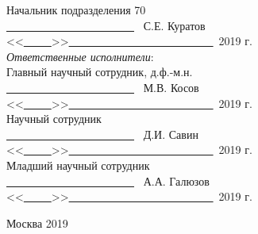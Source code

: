 \documentclass[a4paper,12pt]{article}
\begin{document}
\vspace{-.2cm}

\normalsize

\vspace{0.1 cm}
\begin{flushright}
Начальник подразделения 70 \\
\underline{~~~~~~~~~~~~~~~~~~~~~~~}~{ С.Е. Куратов}\\
<<\underline{~~~~~}>>\underline{~~~~~~~~~~~~~~~~~~~~~~~~~~}~2019 г. \\
\vspace{0.2 cm}
\emph{Ответственные исполнители}:\\
\vspace{0.1 cm}
Главный научный сотрудник, д.ф.-м.н.\\
\underline{~~~~~~~~~~~~~~~~~~~~~~~}~{ М.В. Косов}\\
<<\underline{~~~~~}>>\underline{~~~~~~~~~~~~~~~~~~~~~~~~~~}~2019 г.\\
\vspace{0.1 cm}
Научный сотрудник\\
\underline{~~~~~~~~~~~~~~~~~~~~~~~}~{ Д.И. Савин}\\
<<\underline{~~~~~}>>\underline{~~~~~~~~~~~~~~~~~~~~~~~~~~}~2019 г.\\
\vspace{0.1 cm}
Младший научный сотрудник\\
\underline{~~~~~~~~~~~~~~~~~~~~~~~}~{ А.А. Галюзов}\\
<<\underline{~~~~~}>>\underline{~~~~~~~~~~~~~~~~~~~~~~~~~~}~2019 г.\\
\vspace{.4 cm}
\end{flushright}
\begin{center}
Москва 2019
\end{center}
\end{document}
